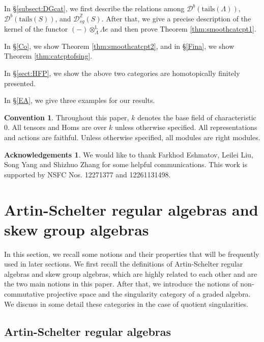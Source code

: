 \documentclass[11pt,reqno]{amsart}
\theoremstyle{definition}
\newtheorem*{convention}{Convention}
\newtheorem*{ack}{Acknowledgements}
\begin{document}
In \S\ref{subsect:DGcat}, we first describe the relations 
among $\mathcal{D}^{b}(\mathrm{tails}(\Lambda))$, 
$\mathcal{D}^{b}(\mathrm{tails}(S))$, and $\mathcal{D}_{sg}^{\mathbb{Z}}(S)$. 
After that, we give a precise description of 
the kernel of the functor $(-) \otimes_{\Lambda}^{\mathbb{L}}\Lambda e$
and then prove
Theorem \ref{thm:smoothcatcpt1}.

In \S\ref{Co}, we show Theorem \ref{thm:smoothcatcpt2},
and in \S\ref{Fina}, we show Theorem \ref{thm:catcptofsing}. 

In \S\ref{sect:HFP},
we show the above two categories
are homotopically finitely presented.

In \S\ref{EA}, we give three examples for our results. 

\begin{convention}
Throughout this paper,
$k$ denotes the base field of characteristic $0$.
All tensors and Homs are over $k$ unless otherwise specified. 
All representations and actions are faithful. Unless otherwise 
specified, all modules are right modules.  
\end{convention}




\begin{ack}We would like to 
thank 
Farkhod Eshmatov, Leilei Liu,
Song Yang 
and Shizhuo Zhang for some helpful communications.
This work is supported by NSFC Nos. 12271377 and 12261131498.
\end{ack}





\section{Artin-Schelter regular algebras and skew group algebras}\label{AN}

In this section, we recall some notions and their properties
that will be frequently used in later sections.
We first recall the definitions of Artin-Schelter regular algebras and
skew group algebras, which are highly related to each 
other and are the two main notions in this paper. After that, 
we introduce the notions of non-commutative 
projective space and 
the singularity category
of a graded algebra. 
We discuss in some detail
these categories in the case of quotient singularities.

\subsection{Artin-Schelter regular algebras}\label{subsect:ASregularalg}
\end{document}
